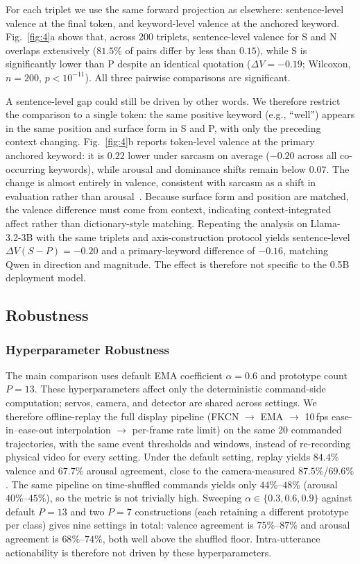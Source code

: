 \documentclass[letterpaper, 10 pt, conference]{ieeeconf/ieeeconf}
\begin{document}
For each triplet we use the same forward projection as elsewhere: sentence-level valence at the final token, and keyword-level valence at the anchored keyword. Fig.~\ref{fig:4}a shows that, across 200 triplets, sentence-level valence for S and N overlaps extensively ($81.5\%$ of pairs differ by less than $0.15$), while S is significantly lower than P despite an identical quotation ($\Delta V=-0.19$; Wilcoxon, $n{=}200$, $p<10^{-11}$). All three pairwise comparisons are significant.

A sentence-level gap could still be driven by other words. We therefore restrict the comparison to a single token: the same positive keyword (e.g., ``well'') appears in the same position and surface form in S and P, with only the preceding context changing. Fig.~\ref{fig:4}b reports token-level valence at the primary anchored keyword: it is $0.22$ lower under sarcasm on average ($-0.20$ across all co-occurring keywords), while arousal and dominance shifts remain below $0.07$. The change is almost entirely in valence, consistent with sarcasm as a shift in evaluation rather than arousal~\cite{leggitt2000emotional}. Because surface form and position are matched, the valence difference must come from context, indicating context-integrated affect rather than dictionary-style matching. Repeating the analysis on Llama-3.2-3B with the same triplets and axis-construction protocol yields sentence-level $\Delta V(S{-}P){=}-0.20$ and a primary-keyword difference of $-0.16$, matching Qwen in direction and magnitude. The effect is therefore not specific to the 0.5B deployment model.


\subsection{Robustness}
\subsubsection{Hyperparameter Robustness}
The main comparison uses default EMA coefficient $\alpha{=}0.6$ and prototype count $P{=}13$. These hyperparameters affect only the deterministic command-side computation; servos, camera, and detector are shared across settings. We therefore offline-replay the full display pipeline (FKCN $\to$ EMA $\to$ 10\,fps ease-in--ease-out interpolation $\to$ per-frame rate limit) on the same 20 commanded trajectories, with the same event thresholds and windows, instead of re-recording physical video for every setting. Under the default setting, replay yields $84.4\%$ valence and $67.7\%$ arousal agreement, close to the camera-measured $87.5\%$/$69.6\%$. The same pipeline on time-shuffled commands yields only $44\%$--$48\%$ (arousal $40\%$--$45\%$), so the metric is not trivially high. Sweeping $\alpha\in\{0.3,0.6,0.9\}$ against default $P{=}13$ and two $P{=}7$ constructions (each retaining a different prototype per class) gives nine settings in total: valence agreement is $75\%$--$87\%$ and arousal agreement is $68\%$--$74\%$, both well above the shuffled floor. Intra-utterance actionability is therefore not driven by these hyperparameters.
\end{document}
